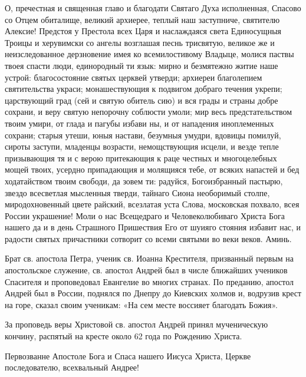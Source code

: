 О,  пречестная и священная  главо  и благодати Святаго Духа исполненная, Спасово со Отцем обиталище, великий архиерее, теплый наш заступниче, святителю Алексие! Предстоя у Престола всех Царя и наслаждаяся света Единосущныя Троицы и херувимски со ангелы возглашая песнь трисвятую, великое же и неизследованное дерзновение имея ко всемилостивому Владыце, молися паствы твоея спасти люди, единородный ти язык: мирно и безмятежно житие наше устрой: благосостояние святых церквей утверди; архиереи благолепием святительства украси; монашествующия к подвигом добраго течения укрепи; царствующий град (сей и святую обитель сию) и вся грады и страны добре сохрани, и веру святую непорочну соблюсти умоли; мир весь предстательством твоим умири, от глада и пагубы избави ны, и от нападения иноплеменных сохрани; старыя утеши, юныя настави, безумныя умудри, вдовицы помилуй, сироты заступи, младенцы возрасти, немощствующия исцели, и везде тепле призывающия тя и с верою притекающия к раце честных и многоцелебных мощей твоих, усердно припадающия и молящияся тебе, от всяких напастей и бед ходатайством твоим свободи, да зовем ти: радуйся, Богоизбранный пастырю, звездо всесветлая мысленныя тверди, тайнаго Сиона необоримый столпе, миродохновенный цвете райский, всезлатая уста Слова, московская похвало, всея России украшение! Моли о нас Всещедраго и Человеколюбиваго Христа Бога нашего да и в день Страшного Пришествия Его от шуияго стояния избавит нас, и радости святых причастники сотворит со всеми святыми во веки веков. Аминь.\mychapterending

 
Брат св. апостола Петра, ученик св. Иоанна Крестителя, призванный первым на апостольское служение, св. апостол Андрей был в числе ближайших учеников Спасителя и проповедовал Евангелие во многих странах. По преданию, апостол Андрей был в России, поднялся по Днепру до Киевских холмов и, водрузив крест на горе, сказал своим ученикам: «На сем месте воссияет благодать Божия». 

За проповедь веры Христовой св. апостол Андрей принял мученическую кончину, распятый на кресте около 62 года по Рождению Xриста.




Первозванне Апостоле Бога и Спаса нашего Иисуса Христа, Церкве последователю, всехвальный Андрее! 

